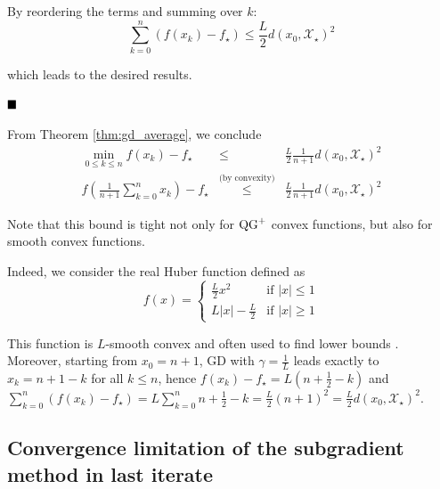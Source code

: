     By reordering the terms and summing over $k$:
    \begin{equation}
        \sum_{k=0}^n (f(x_k) - f_\star) \leq \frac{L}{2}d(x_0, \mathcal{X}_\star)^2
    \end{equation}
    
    which leads to the desired results.
    
$\hfill\blacksquare$

\begin{Rem}
    \label{rem:gd_average}
    From Theorem \ref{thm:gd_average}, we conclude
    \begin{eqnarray*}
        \min_{0 \leq k \leq n} f(x_k) - f_\star & \leq & \frac{L}{2}\frac{1}{n+1} d(x_0, \mathcal{X}_\star)^2 \\
        f\left( \frac{1}{n+1}\sum_{k=0}^n x_k \right) - f_\star & \overset{\text{(by convexity)}}{\leq} & \frac{L}{2}\frac{1}{n+1} d(x_0, \mathcal{X}_\star)^2
    \end{eqnarray*}
\end{Rem}

\begin{Rem}
    Note that this bound is tight not only for $\operatorname{QG}^+$ convex functions, but also for smooth convex functions.
    
    Indeed, we consider the real Huber function defined as
    \begin{equation}
        \label{eq:huber}
        f(x) = \left\{
        \begin{array}{cc}
            \frac{L}{2}x^2 & \text{if } |x| \leq 1 \\
            L|x| - \frac{L}{2} & \text{if } |x| \geq 1
        \end{array}
        \right.
    \end{equation}
    
    This function is $L$-smooth convex and often used to find lower bounds \citep[See e.g.][]{drori2014performance,taylor2017smooth,kim2016optimized}.
    Moreover, starting from $x_0 = n + 1$, GD with $\gamma = \frac{1}{L}$ leads exactly to $x_k = n+1-k$ for all $k\leq n$, hence $f(x_k) - f_\star = L \left(n+\frac{1}{2}-k\right)$ and $\sum_{k=0}^n (f(x_k) - f_\star) = L \sum_{k=0}^n n+\frac{1}{2}-k = \frac{L}{2}(n+1)^2 = \frac{L}{2}d(x_0, \mathcal{X}_\star)^2$.
\end{Rem}

\subsection{Convergence limitation of the subgradient method in last iterate}\label{apx:gd_lower_bound}

